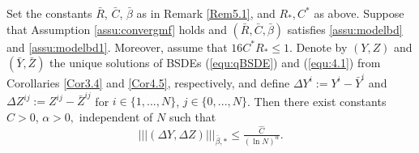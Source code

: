 \documentclass[10pt,a4paper]{amsart}
\newcommand{\bC}{\bar{C}}
\newcommand{\bR}{\bar{R}}
\newcommand{\be}{\begin{equation}}
\newcommand{\ee}{\end{equation}}
\newcommand{\hC}{\hat{C}}
\newcommand{\trinm}[1]{\vert\!\vert\!\vert #1 \vert\!\vert\!\vert}
\begin{document}
\begin{Theorem}
\label{Thm5.3}
Set the constants $\bR$, $\bC$, $\bar{\beta}$ as in Remark \ref{Rem5.1}, and $R_{*} , C^{*}$ as above. Suppose that Assumption \ref{assu:convergmf} holds and $(\bR, \bC, \bar{\beta})$ satisfies \eqref{assu:modelbd} and \eqref{assu:modelbd1}. Moreover, assume that $16C^{*}R_{*} \leq 1$.
Denote by $(Y,Z)$ and $(\bar{Y},\bar{Z})$ the unique solutions of BSDEs \textnormal{(\ref{equ:qBSDE})} and \textnormal{(\ref{equ:4.1})} from Corollaries \ref{Cor3.4} and \ref{Cor4.5}, respectively, and define $\Delta Y^{i} := Y^{i}-\bar{Y}^{i}$ and $\Delta Z^{ij} := Z^{ij} - \bar{Z}^{ij}$ for $i \in \{1,...,N\}$, $j \in \{0,...,N\}$. Then there exist constants $\hC >0$, $\alpha>0,$ independent of $N$ such that
\be
\trinm{(\Delta Y,\Delta Z)}_{\bar{\beta},*} \leq \tfrac{\hC}{(\ln{N})^{\alpha}}.
\ee
\end{Theorem}
\end{document}
